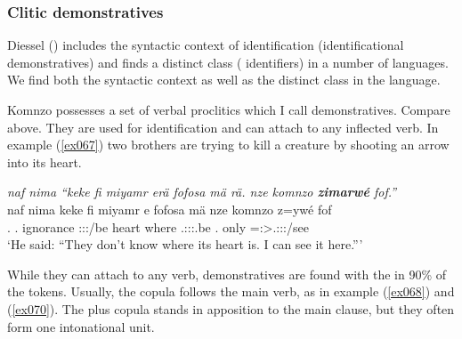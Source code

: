 \subsubsection{Clitic demonstratives} \label{demonstrative-identifiers}

Diessel (\citeyear{Diessel:2009tg}) includes the syntactic context of identification (identificational demonstratives) and finds a distinct class ( identifiers) in a number of languages. We find both the syntactic context as well as the distinct class in the language.%

Komnzo possesses a set of  verbal proclitics which I call  demonstratives. Compare  above. They are used for identification and can attach to any inflected verb. In example (\ref{ex067}) two brothers are trying to kill a creature by shooting an arrow into its heart.

\begin{exe}
	\ex \emph{naf nima ``keke fi miyamr erä fofosa mä rä. nze komnzo \textbf{zimarwé} fof.''}\\
	\gll naf nima keke fi miyamr e fofosa mä  nze komnzo z=ywé fof\\
	\Tsg.\Erg{} \Quot{} \Neg{} \Third.\Abs{} ignorance \Stpl:\Sbj:\Nonpast:\Ipfv/be heart where \Tsg.\F:\Sbj:\Nonpast:\Ipfv.be \Fsg.\Erg{} only \Prox=\Fsg:\Sbj>\Tsg.\Masc:\Obj:\Nonpast:\Ipfv/see \Emph{}\\
	\trans `He said: ``They don't know where its heart is. I can see it here.'''\\ 
	\label{ex067}
\end{exe}

While they can attach to any verb,  demonstratives are found with the  in 90\% of the tokens. Usually, the copula follows the main verb, as in example (\ref{ex068}) and (\ref{ex070}). The   plus copula stands in apposition to the main clause, but they often form one intonational unit.

